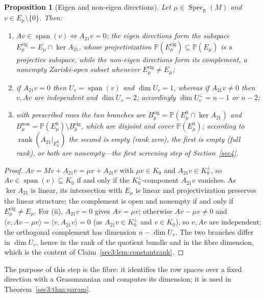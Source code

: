 \documentclass[journal]{IEEEtran}
\theoremstyle{plainn}
\newtheorem{prop}{Proposition}
\theoremstyle{remark}
\newcommand{\rank}{\operatorname{rank}}
\begin{document}
\begin{prop}[Eigen and non-eigen directions]
\label{sec3:lem:eigen}
\label{sec3:prop:strata}
\label{sec3:lem:dimU}
\label{sec3:rem:rankcases}
Let $\mu\in\operatorname{Spec}_{\mathbb{R}}(M)$ and $v\in E_\mu\setminus\{0\}$. Then:
\begin{enumerate}[label=(\roman*),leftmargin=*,itemsep=1pt,topsep=2pt]
\item $Av\in\operatorname{span}(v)\iff A_{21}v=0$; the \emph{eigen directions} form the subspace
$E_\mu^{\mathrm{eig}}=E_\mu\cap\ker A_{21}$, whose projectivization
$\mathbb{P}(E_\mu^{\mathrm{eig}})\subseteq\mathbb{P}(E_\mu)$ is a projective subspace, while the
\emph{non-eigen directions} form its complement, a nonempty Zariski-open subset whenever
$E_\mu^{\mathrm{eig}}\ne E_\mu$;
\item if $A_{21}v=0$ then $U_v=\operatorname{span}(v)$ and $\dim U_v=1$, whereas if $A_{21}v\ne0$ then
$v,Av$ are independent and $\dim U_v=2$; accordingly $\dim U_v^\perp=n-1$ or $n-2$;
\item with prescribed rows the two branches are $B_\mu^{\mathrm{eig}}=\mathbb{P}(E_\mu^0\cap\ker A_{21})$
and $B_\mu^{\mathrm{non}}=\mathbb{P}(E_\mu^0)\setminus B_\mu^{\mathrm{eig}}$, which are disjoint and
cover $\mathbb{P}(E_\mu^0)$; according to $\rank(A_{21}|_{E_\mu^0})$ the second is empty (rank zero),
the first is empty (full rank), or both are nonempty—the first screening step of
Section~\ref{sec4}.
\end{enumerate}
\end{prop}
\begin{proof}
$Av=Mv+A_{21}v=\mu v+A_{21}v$ with $\mu v\in K_0$ and $A_{21}v\in K_0^\perp$, so
$Av\in\operatorname{span}(v)\subseteq K_0$ if and only if the $K_0^\perp$-component $A_{21}v$ vanishes.
As $\ker A_{21}$ is linear, its intersection with $E_\mu$ is linear and projectivization preserves the
linear structure; the complement is open and nonempty if and only if
$E_\mu^{\mathrm{eig}}\ne E_\mu$. For (ii), $A_{21}v=0$ gives $Av=\mu v$; otherwise $Av-\mu v\ne0$ and
$\langle v,Av-\mu v\rangle=\langle v,A_{21}v\rangle=0$ (as $A_{21}v\in K_0^\perp$ and $v\in K_0$), so
$v,Av$ are independent; the orthogonal complement has dimension $n-\dim U_v$. The two branches differ
in $\dim U_v$, hence in the rank of the quotient bundle and in the fibre dimension, which is the
content of Claim~\ref{sec3:lem:constantrank}.
\end{proof}


The purpose of this step is the fibre: it identifies the row spaces over a fixed direction with a
Grassmannian and computes its dimension; it is used in Theorem~\ref{sec3:thm:param}.
\end{document}
